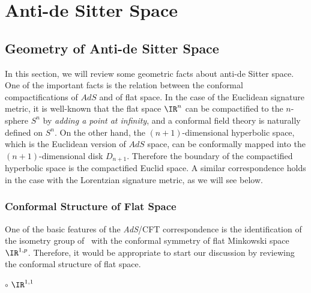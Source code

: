 
\section{Anti-de Sitter Space} 
\label{adsgeom}

\subsection{Geometry of Anti-de Sitter Space}

In this section, we will review some geometric facts about 
anti-de Sitter space. One of the important facts is
the relation between the conformal compactifications of $AdS$
and of flat space. In the case of the Euclidean signature
metric, it is well-known that the flat
space $\IR^n$ can be compactified to the $n$-sphere $S^n$ by 
{\it adding a point at infinity}, and a conformal
field theory is naturally defined on $S^n$. On the other hand, 
the $(n+1)$-dimensional hyperbolic space, which is the Euclidean
version of $AdS$ space, can be conformally
mapped into the $(n+1)$-dimensional disk $D_{n+1}$.
Therefore the boundary
of the compactified hyperbolic space is the compactified
Euclid space. A similar correspondence holds in the 
case with the Lorentzian signature metric, as we will see below. 


\subsubsection{Conformal Structure of Flat Space}
\label{confflatspace}

One of the basic features  of the {\it AdS}/CFT correspondence
is the identification of the isometry group of \adsp\ with the conformal
symmetry of flat Minkowski space $\IR^{1,p}$. Therefore, it would be
appropriate to start our discussion by reviewing the conformal structure of 
flat space. 

\bigskip
\noindent $\circ$ $\IR^{1,1}$

\medskip

